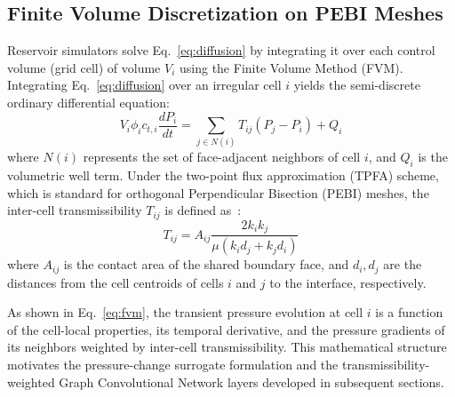 \subsection{Finite Volume Discretization on PEBI Meshes}
Reservoir simulators solve Eq.~\ref{eq:diffusion} by integrating it over each control volume (grid cell) of volume $V_i$ using the Finite Volume Method (FVM). Integrating Eq.~\ref{eq:diffusion} over an irregular cell $i$ yields the semi-discrete ordinary differential equation:
\begin{equation}
\label{eq:fvm}
V_i \phi_i c_{t,i} \frac{d P_i}{d t} = \sum_{j \in N(i)} T_{ij} (P_j - P_i) + Q_i
\end{equation}
where $N(i)$ represents the set of face-adjacent neighbors of cell $i$, and $Q_i$ is the volumetric well term. Under the two-point flux approximation (TPFA) scheme, which is standard for orthogonal Perpendicular Bisection (PEBI) meshes, the inter-cell transmissibility $T_{ij}$ is defined as~\cite{ahmed2015mpfa, pal2006tensor}:
\begin{equation}
\label{eq:trans}
T_{ij} = A_{ij} \frac{2 k_i k_j}{\mu (k_i d_j + k_j d_i)}
\end{equation}
where $A_{ij}$ is the contact area of the shared boundary face, and $d_i, d_j$ are the distances from the cell centroids of cells $i$ and $j$ to the interface, respectively. 

As shown in Eq.~\ref{eq:fvm}, the transient pressure evolution at cell $i$ is a function of the cell-local properties, its temporal derivative, and the pressure gradients of its neighbors weighted by inter-cell transmissibility. This mathematical structure motivates the pressure-change surrogate formulation and the transmissibility-weighted Graph Convolutional Network layers developed in subsequent sections.
